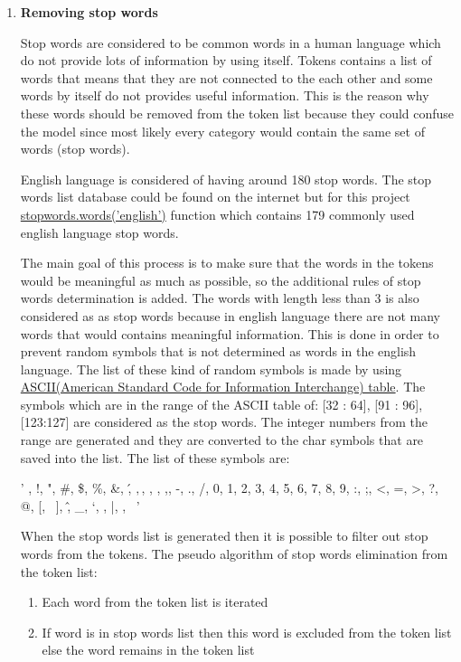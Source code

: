 \begin{enumerate}
    \item \textbf{Removing stop words}
    
    Stop words are considered to be common words in a human language which do not provide lots of information by using itself. Tokens contains a list of words that means that they are not connected to the each other and some words by itself do not provides useful information. This is the reason why these words should be removed from the token list because they could confuse the model since most likely every category would contain the same set of words (stop words).
    
    English language is considered of having around 180 stop words. The stop words list database could be found on the internet but for this project \href{https://www.nltk.org/book/ch02.html}{stopwords.words('english')} function which contains 179 commonly used english language stop words. 
    
    
    The main goal of this process is to make sure that the words in the tokens would be meaningful as much as possible, so the additional rules of stop words determination is added. The words with length less than 3 is also considered as as stop words because in english language there are not many words that would contains meaningful information. This is done in order to prevent random symbols that is not determined as words in the english language. The list of these kind of random symbols is made by using \href{http://www.asciitable.com/ASCII} {ASCII(American Standard Code for Information Interchange) table}. The symbols which are in the range of the ASCII table of: [32 : 64], [91 : 96], [123:127] are considered as the stop words. The integer numbers from the range are generated and they are converted to the char symbols that are saved into the list. The list of these symbols are:
    
    ' , !, ", #, \$, \%, \&, \', \(, \), \*, \+, ,, -, ., /, 0, 1, 2, 3, 4, 5, 6, 7, 8, 9, :, ;, <, =, >, ?, @, [, \, ], \^, \_, `, {, |, }, ~'
    
    
    When the stop words list is generated then it is possible to filter out stop words from the tokens. The pseudo algorithm of stop words elimination from the token list:
    \begin{enumerate}
        \item Each word from the token list is iterated
        \item If word is in stop words list then this word is excluded from the token list else the word remains in the token list
    \end{enumerate}
        

\end{enumerate}
